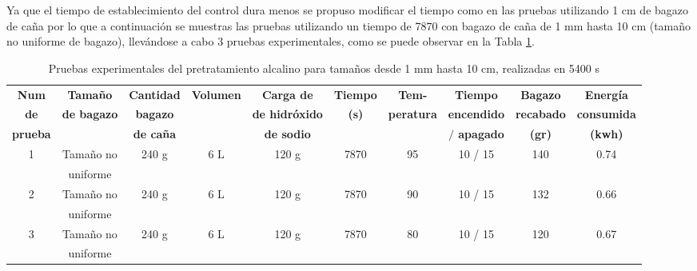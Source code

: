 \documentclass[12pt]{article}
\begin{document}
	Ya que el tiempo de establecimiento del control dura menos se propuso modificar el tiempo como en las pruebas utilizando 1 cm de bagazo de caña por lo que a continuación se muestras las pruebas utilizando un tiempo de 7870 con bagazo de caña de 1 mm hasta 10 cm (tamaño no uniforme de bagazo), llevándose a cabo 3 pruebas experimentales, como se puede observar en la Tabla \ref{pruebas 7870}.
	
		 	\begin{table}[H]
		\centering
		\caption{Pruebas experimentales del pretratamiento alcalino para tamaños desde 1 mm hasta 10 cm, realizadas en 5400 s}
		\label{pruebas 7870}
		\resizebox{16cm}{!} {
			\begin{tabular}{|c|c|c|c|c|c|c|c|c|c|  }
				\hline
\textbf{Num} & \textbf{Tamaño } & \textbf{Cantidad } & \textbf{Volumen} & \textbf{Carga de} & \textbf{Tiempo} & \textbf{Tem-} & \textbf{Tiempo} & \textbf{Bagazo} & \textbf{Energía} \\
\textbf{de}& \textbf{ de bagazo} & \textbf{ bagazo} & & \textbf{de hidróxido} & \textbf{(s)} & \textbf{peratura}&  \textbf{ encendido}& \textbf{recabado} &\textbf{consumida}  \\

\textbf{prueba}	& &  \textbf{ de caña} & &\textbf{de sodio}  &  &  &\textbf{$/$ apagado} &\textbf{(gr)} & \textbf{(kwh)}\\


				
				
				\hline
				1   & Tamaño no  & 240 g & 6 L & 120 g & 7870 & 95 & 10 / 15 &  140&0.74 \\
			  	    & uniforme&       &     &       &      &    &         &      &\\	\hline
								
				2 & Tamaño no & 240 g & 6 L & 120 g & 7870& 90 & 10 / 15 &  132 &0.66 \\
				  & uniforme &      &     &       &      &    &         &      &\\	\hline
								
				3 & Tamaño no & 240 g & 6 L & 120 g & 7870 & 80 & 10 / 15 &  120 &0.67\\
				  & uniforme&       &     &       &      &    &         &      &\\	\hline
				
				\hline
			\end{tabular}
		}
		
	\end{table}
	
	
	
\end{document}
